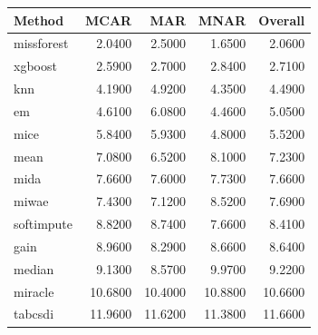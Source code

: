 \begin{tabular}{lrrrr}
\toprule
Method & MCAR & MAR & MNAR & Overall \\
\midrule
missforest & 2.0400 & 2.5000 & 1.6500 & 2.0600 \\
xgboost & 2.5900 & 2.7000 & 2.8400 & 2.7100 \\
knn & 4.1900 & 4.9200 & 4.3500 & 4.4900 \\
em & 4.6100 & 6.0800 & 4.4600 & 5.0500 \\
mice & 5.8400 & 5.9300 & 4.8000 & 5.5200 \\
mean & 7.0800 & 6.5200 & 8.1000 & 7.2300 \\
mida & 7.6600 & 7.6000 & 7.7300 & 7.6600 \\
miwae & 7.4300 & 7.1200 & 8.5200 & 7.6900 \\
softimpute & 8.8200 & 8.7400 & 7.6600 & 8.4100 \\
gain & 8.9600 & 8.2900 & 8.6600 & 8.6400 \\
median & 9.1300 & 8.5700 & 9.9700 & 9.2200 \\
miracle & 10.6800 & 10.4000 & 10.8800 & 10.6600 \\
tabcsdi & 11.9600 & 11.6200 & 11.3800 & 11.6600 \\
\bottomrule
\end{tabular}
